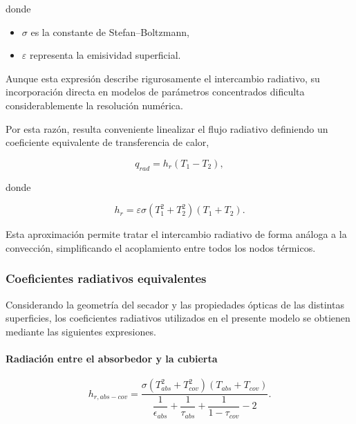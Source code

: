 donde

\begin{itemize}

\item $\sigma$ es la constante de Stefan--Boltzmann,

\item $\varepsilon$ representa la emisividad superficial.

\end{itemize}

Aunque esta expresión describe rigurosamente el intercambio radiativo, su incorporación directa en modelos de parámetros concentrados dificulta considerablemente la resolución numérica.

Por esta razón, resulta conveniente linealizar el flujo radiativo definiendo un coeficiente equivalente de transferencia de calor,

\begin{equation}
q_{rad}
=
h_r
(T_1-T_2),
\end{equation}

donde

\begin{equation}
h_r
=
\varepsilon\sigma
(T_1^2+T_2^2)
(T_1+T_2).
\end{equation}

Esta aproximación permite tratar el intercambio radiativo de forma análoga a la convección, simplificando el acoplamiento entre todos los nodos térmicos.

\subsubsection{Coeficientes radiativos equivalentes}

Considerando la geometría del secador y las propiedades ópticas de las distintas superficies, los coeficientes radiativos utilizados en el presente modelo se obtienen mediante las siguientes expresiones.

\paragraph{Radiación entre el absorbedor y la cubierta}

\begin{equation}
h_{r,abs-cov}
=
\frac{
\sigma
(T_{abs}^2+T_{cov}^2)
(T_{abs}+T_{cov})
}
{
\dfrac1{\epsilon_{abs}}
+
\dfrac1{\tau_{abs}}
+
\dfrac1{1-\tau_{cov}}
-
2
}.
\end{equation}

